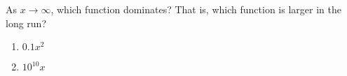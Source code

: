 \bigskip

\item As $x \rightarrow \infty$, which function dominates?  That is, which function is larger in the long run?

\begin{enumerate}
\item $0.1 x^2$
\item $10^{10} x$
\end{enumerate}

